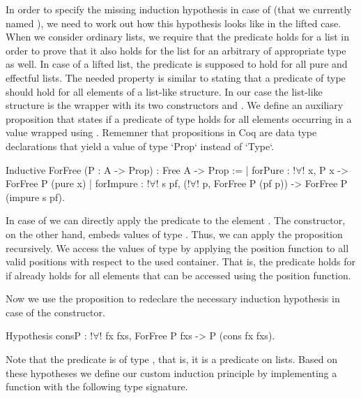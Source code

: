 In order to specify the missing induction hypothesis in case of  (that we currently named ), we need to work out how this hypothesis looks like in the lifted case.
When we consider ordinary lists, we require that the predicate holds for a list  in order to prove that it also holds for the list  for an arbitrary  of appropriate type as well.
In case of a lifted list, the predicate is supposed to hold for all
pure and effectful lists.
The needed property is similar to stating that a predicate of type  should hold for all elements of a list\--like structure.
In our case the list\--like structure is the  wrapper with its two constructors  and .
We define an auxiliary proposition  that states if a predicate of type  holds for all elements occurring in a value wrapped using .
Rememner that propositions in Coq are data type declarations that yield a value of type `Prop` instead of `Type`.

\begin{coqcode}
Inductive ForFree (P : A -> Prop) : Free A -> Prop :=
| forPure   : !$\forall$! x, P x -> ForFree P (pure x)
| forImpure : !$\forall$! s pf, (!$\forall$! p, ForFree P (pf p)) -> ForFree P (impure s pf).
\end{coqcode}

In case of  we can directly apply the predicate to the element .
The  constructor, on the other hand, embeds values of type .
Thus, we can apply the proposition  recursively.
We access the values of type  by applying the position function to all valid positions with respect to the used container.
That is, the predicate holds for  if  already holds for all elements that can be accessed using the position function.

Now we use the proposition  to redeclare the necessary induction hypothesis in case of the  constructor.

\begin{coqcode}
Hypothesis consP : !$\forall$! fx fxs, ForFree P fxs -> P (cons fx fxs).
\end{coqcode}

Note that the predicate  is of type , that is, it is a predicate on lists.
Based on these hypotheses we define our custom induction principle by implementing a function with the following type signature.

